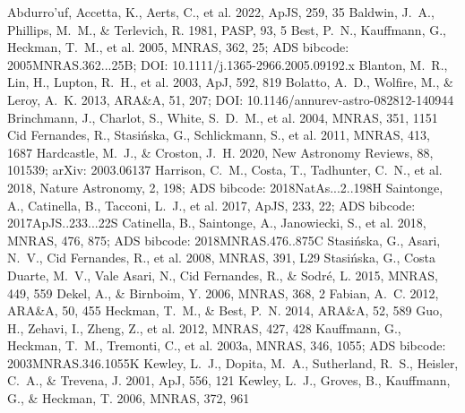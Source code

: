 \documentclass[twocolumn]{aastex631}
\begin{document}
\begin{thebibliography}{}
 Abdurro'uf, Accetta, K., Aerts, C., et al. 2022, ApJS, 259, 35
 Baldwin, J.~A., Phillips, M.~M., \& Terlevich, R. 1981, PASP, 93, 5
 Best, P.~N., Kauffmann, G., Heckman, T.~M., et al. 2005, MNRAS, 362, 25; ADS bibcode: 2005MNRAS.362...25B; DOI: 10.1111/j.1365-2966.2005.09192.x
 Blanton, M.~R., Lin, H., Lupton, R.~H., et al. 2003, ApJ, 592, 819
 Bolatto, A.~D., Wolfire, M., \& Leroy, A.~K. 2013, ARA\&A, 51, 207; DOI: 10.1146/annurev-astro-082812-140944
 Brinchmann, J., Charlot, S., White, S.~D.~M., et al. 2004, MNRAS, 351, 1151
 Cid Fernandes, R., Stasi{\'n}ska, G., Schlickmann, S., et al. 2011, MNRAS, 413, 1687
 Hardcastle, M.~J., \& Croston, J.~H. 2020, New Astronomy Reviews, 88, 101539; arXiv: 2003.06137
 Harrison, C.~M., Costa, T., Tadhunter, C.~N., et al. 2018, Nature Astronomy, 2, 198; ADS bibcode: 2018NatAs...2..198H
 Saintonge, A., Catinella, B., Tacconi, L.~J., et al. 2017, ApJS, 233, 22; ADS bibcode: 2017ApJS..233...22S
 Catinella, B., Saintonge, A., Janowiecki, S., et al. 2018, MNRAS, 476, 875; ADS bibcode: 2018MNRAS.476..875C
 Stasi{\'n}ska, G., Asari, N.~V., Cid Fernandes, R., et al. 2008, MNRAS, 391, L29
 Stasi{\'n}ska, G., Costa Duarte, M.~V., Vale Asari, N., Cid Fernandes, R., \& Sodr{\'e}, L. 2015, MNRAS, 449, 559
 Dekel, A., \& Birnboim, Y. 2006, MNRAS, 368, 2
 Fabian, A.~C. 2012, ARA\&A, 50, 455
 Heckman, T.~M., \& Best, P.~N. 2014, ARA\&A, 52, 589
 Guo, H., Zehavi, I., Zheng, Z., et al. 2012, MNRAS, 427, 428
 Kauffmann, G., Heckman, T.~M., Tremonti, C., et al. 2003a, MNRAS, 346, 1055; ADS bibcode: 2003MNRAS.346.1055K
 Kewley, L.~J., Dopita, M.~A., Sutherland, R.~S., Heisler, C.~A., \& Trevena, J. 2001, ApJ, 556, 121
 Kewley, L.~J., Groves, B., Kauffmann, G., \& Heckman, T. 2006, MNRAS, 372, 961

\end{thebibliography}
\end{document}
